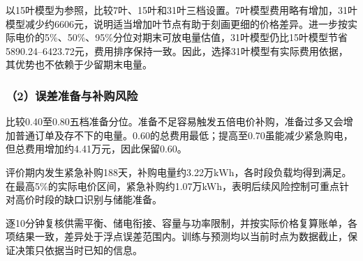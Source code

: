 以15叶模型为参照，比较7叶、15叶和31叶三档设置。7叶模型费用略有增加，31叶模型减少约6606元，说明适当增加叶节点有助于刻画更细的价格差异。进一步按实际电价的5\%、50\%、95\%分位对期末可放电量估值，31叶模型仍比15叶模型节省5890.24--6423.72元，费用排序保持一致。因此，选择31叶模型有实际费用依据，其优势也不依赖于少留期末电量。

\subsubsection*{（2）误差准备与补购风险}

比较0.40至0.80五档准备分位。准备不足容易触发五倍电价补购，准备过多又会增加普通订单及存不下的电量。0.60的总费用最低；提高至0.70虽能减少紧急购电，但总费用增加约4.41万元，因此保留0.60。

评价期内发生紧急补购188天，补购电量约3.22万$\mathrm{kWh}$，各时段负载均得到满足。在最高5\%的实际电价区间，紧急补购约1.07万kWh，表明后续风险控制可重点针对高价时段的缺口识别与储能准备。

逐10分钟复核供需平衡、储电衔接、容量与功率限制，并按实际价格复算账单，各项结果一致，差异处于浮点误差范围内。训练与预测均以当前时点为数据截止，保证决策只依据当时已知的信息。
